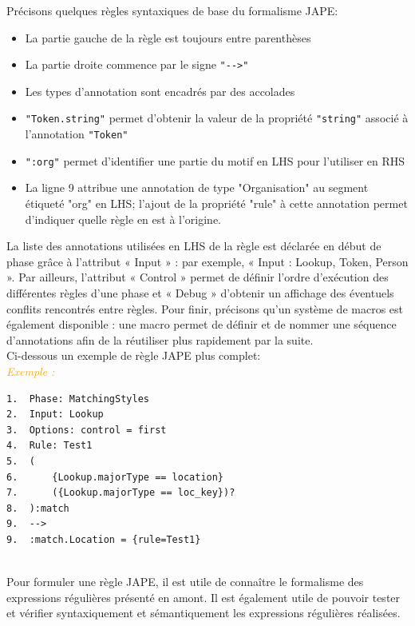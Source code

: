\documentclass[a4paper, 11pt]{report}
\newenvironment{exemple}
    {
    \textit{\textcolor{orange}{
    Exemple : \\}}
    }
    {~\\
    }
\begin{document}
Précisons quelques règles syntaxiques de base du formalisme JAPE:
\begin{itemize}
	\item La partie gauche de la règle est toujours entre parenthèses
	\item La partie droite commence par le signe \verb|"-->"|
	\item Les types d'annotation sont encadrés par des accolades
	\item \verb|"Token.string"| permet d'obtenir la valeur de la propriété \verb|"string"| associé à l'annotation \verb|"Token"|
	\item \verb|":org"| permet d'identifier une partie du motif en LHS pour l'utiliser en RHS
	\item La ligne 9 attribue une annotation de type "Organisation" au segment étiqueté "org" en LHS; l'ajout de la propriété "rule" à cette annotation permet d'indiquer quelle règle en est à l'origine.
\end{itemize}
La liste des annotations utilisées en LHS de la règle est déclarée en début de phase grâce à l'attribut « Input » : par exemple, « Input : Lookup, Token, Person ». Par ailleurs, l'attribut « Control » permet de définir l'ordre d'exécution des différentes règles d'une phase et « Debug »
d'obtenir un affichage des éventuels conflits rencontrés entre règles.
Pour finir, précisons qu'un système de macros est également disponible : une macro permet
de définir et de nommer une séquence d'annotations afin de la réutiliser plus rapidement par la suite.\\
Ci-dessous un exemple de règle JAPE plus complet:\\
\begin{exemple}
\begin{verbatim}
1.	Phase: MatchingStyles
2.	Input: Lookup
3.	Options: control = first
4.	Rule: Test1
5.	(
6.		{Lookup.majorType == location}
7.		({Lookup.majorType == loc_key})?
8.	):match
9.	-->
9.	:match.Location = {rule=Test1}
\end{verbatim}
\end{exemple}
Pour formuler une règle JAPE, il est utile de connaître le formalisme des expressions régulières présenté en amont. Il est également utile de pouvoir tester et vérifier syntaxiquement et sémantiquement les expressions régulières réalisées.
\newpage
\end{document}
